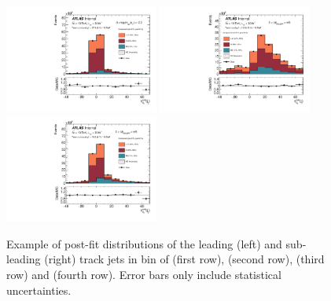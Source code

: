 \begin{figure}[htbp]
 \includegraphics[width=0.45\textwidth]{figures/gbb/paperplots/Canv_Fit_b0_25_M_0_3_LpT_INF_SpT_INF_coarse_y}
 \includegraphics[width=0.45\textwidth]{figures/gbb/paperplots/Canv_Fit_dphi_LpT_INF_SpT_INF_coarse_x}
 \includegraphics[width=0.45\textwidth]{figures/gbb/paperplots/Canv_Fit_b0_25_dphi_0_3_LpT_INF_SpT_INF_coarse_y}
\caption{Example of post-fit \subsdzero distributions of the leading (left) and sub-leading (right) track jets in bin of \drbb (first row), \zpt (second row), \mpt (third row) and \dphi (fourth row). Error bars only include statistical uncertainties.}
  \label{fig:fit-example}
\end{figure}

